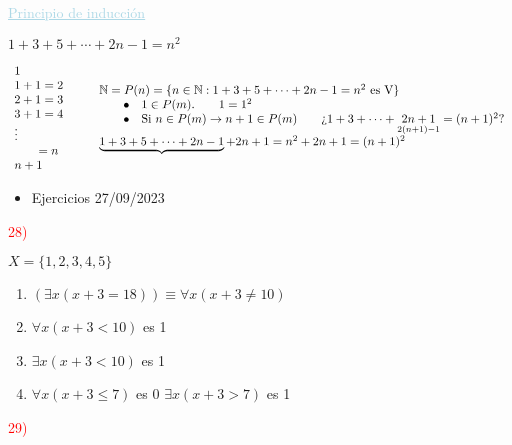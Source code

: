 \documentclass[12pt]{article}
\renewcommand{\arraystretch}{1.15}
\begin{document}
\textcolor{lightblue}{\underline{Principio de inducción}}

$1+3+5+\cdots+2n-1=n^2$

{\renewcommand{\arraystretch}{1}$\begin{array}{l}
	1\\
	1+1=2\\
	2+1=3\\
	3+1=4\\
	\vdots\\
	\qquad=n\\
	n+1
\end{array}\qquad \begin{array}{l}
\mathbb{N}=P(n)=\{n\in\mathbb{N}:1+3+5+\cdots+2n-1=n^2\text{ es V}\}\\
\qquad\bullet\quad1\in P(m).\qquad1=1^2\\
\qquad\bullet\quad \text{Si }n\in P(m)\rightarrow n+1\in P(m)\qquad \text{\textquestiondown} 1+3+\cdots+\underset{2(n+1)-1}{2n+1}=(n+1)^2?\\
\underbrace{1+3+5+\cdots+2n-1}+2n+1=n^2+2n+1=(n+1)^2 
\end{array}$} 

\begin{itemize}[label=\color{red}\textbullet, leftmargin=*]
	\item \color{lightblue}Ejercicios 27/09/2023
\end{itemize}
\textcolor{red}{28)}

$X=\{1,2,3,4,5\}$
\begin{enumerate}[label=\color{red}\alph*)]
	\item $(\exists x(x+3=18))\equiv \forall x(x+3\neq10)$
	\item $\forall x(x+3<10)$ es 1
	\item $\exists x(x+3<10)$ es 1
	\item $\forall x(x+3\le 7)$ es 0 $\exists x(x+3>7)$ es 1
\end{enumerate}
\textcolor{red}{29)}
\end{document}
